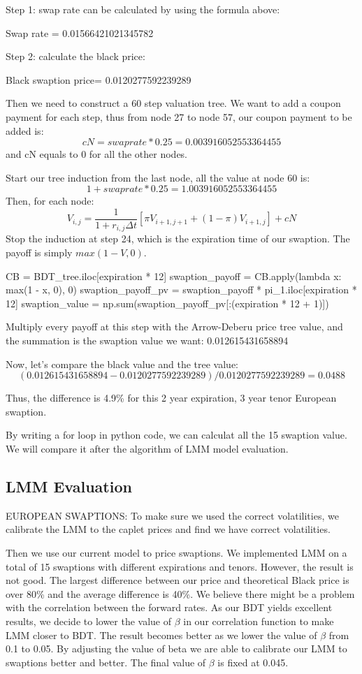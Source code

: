 \documentclass[paper = letterpaper, fontsize=12pt]{article}
\begin{document}
Step 1: swap rate can be calculated by using the formula above:

	Swap rate = 0.01566421021345782

Step 2: calculate the black price: 

	Black swaption price= 0.0120277592239289
	
Then we need to construct a 60 step valuation tree.  We want to add a coupon payment for each step, thus from node 27 to node 57, our coupon payment to be added is:
\[
	cN = swaprate*0.25 = 0.003916052553364455
\]
and cN equals to 0 for all the other nodes.

Start our tree induction from the last node, all the value at node 60 is:
\[
1+ swaprate * 0.25 =1.003916052553364455
\]
Then, for each node:
\[
V_{i,j} = \frac{1}{1+r_{i,j}\Delta t}[\pi V_{i+1, j+1} + (1-\pi)V_{i+1, j}] + cN
\]
Stop the induction at step 24, which is the expiration time of our swaption. The payoff is simply $max(1-V, 0)$.

\begin{python}
CB = BDT_tree.iloc[expiration * 12]
swaption_payoff = CB.apply(lambda x: max(1 - x, 0), 0)
swaption_payoff_pv = swaption_payoff * pi_1.iloc[expiration * 12]
swaption_value = np.sum(swaption_payoff_pv[:(expiration * 12 + 1)])
\end{python}
Multiply every payoff at this step with the Arrow-Deberu price tree value, and the summation is the swaption value we want: 0.012615431658894

Now, let's compare the black value and the tree value:
\[
(0.012615431658894 - 0.0120277592239289)/0.0120277592239289 = 0.0488
\]

Thus, the difference is 4.9\% for this 2 year expiration, 3 year tenor European swaption.

By writing a for loop in python code, we can calculat all the 15 swaption value. We will compare it after the algorithm of LMM model evaluation.
\subsection{LMM Evaluation}
EUROPEAN SWAPTIONS:
To make sure we used the correct volatilities, we calibrate the LMM to the caplet prices and find we have correct volatilities.

Then we use our current model to price swaptions. We implemented LMM on a total of 15 swaptions with different expirations and tenors. However, the result is not good. The largest difference between our price and theoretical Black price is over 80\% and the average difference is 40\%. We believe there might be a problem with the correlation between the forward rates. As our BDT yields excellent results, we decide to lower the value of $\beta$ in our correlation function to make LMM closer to BDT. The result becomes better as we lower the value of $\beta$ from 0.1 to 0.05.  By adjusting the value of beta we are able to calibrate our LMM to swaptions better and better. The final value of $\beta$ is fixed at 0.045. 
\end{document}
